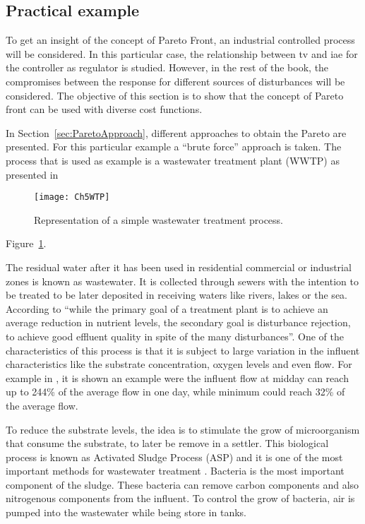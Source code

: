 \subsection{Practical example}
\label{sec:ParetoPractical}
To get an insight of the concept of Pareto Front, an industrial controlled process will be considered. In this particular case, the relationship between \gls{tv} and \gls{iae} for the controller as regulator is studied. However, in the rest of the book, the compromises between the response for different sources of disturbances will be considered. The objective of this section is to show that the concept of Pareto front can be used with diverse cost functions.

In Section~\ref{sec:ParetoApproach}, different approaches to obtain the Pareto are presented. For this particular example a ``brute force'' approach is taken. The process that is used as example is a wastewater treatment plant (WWTP) as presented in %
%
\begin{figure}[tb]
	\centering
	\texttt{[image: Ch5WTP]}
	\caption{Representation of a simple wastewater treatment process.}
	\label{sec:Ch5WTP}
\end{figure}
%
Figure~\ref{sec:Ch5WTP}.

The residual water after it has been used in residential commercial or industrial zones is known as wastewater. It is collected through sewers with the intention to be treated to be later deposited in receiving waters like rivers, lakes or the sea. According to \citet{Olsson1999} ``while the primary goal of a treatment plant is to achieve an average reduction in nutrient levels, the secondary goal is disturbance rejection, to achieve good effluent quality in spite of the many disturbances''. One of the characteristics of this process is that it is subject to large variation in the influent characteristics like the substrate concentration, oxygen levels and even flow. For example in \citet{Henze1997}, it is shown an example were the influent flow at midday can reach up to 244\% of the average flow in one day, while minimum could reach 32\% of the average flow.

To reduce the substrate levels, the idea is to stimulate the grow of microorganism that consume the substrate, to later be remove in a settler. This biological process is known as Activated Sludge Process (ASP) and it is one of the most important methods for wastewater treatment \citep{Henze1997}. Bacteria is the most important component of the sludge. These bacteria can remove carbon components and also nitrogenous components from the influent. To control the grow of bacteria, air is pumped into the wastewater while being store in tanks.

